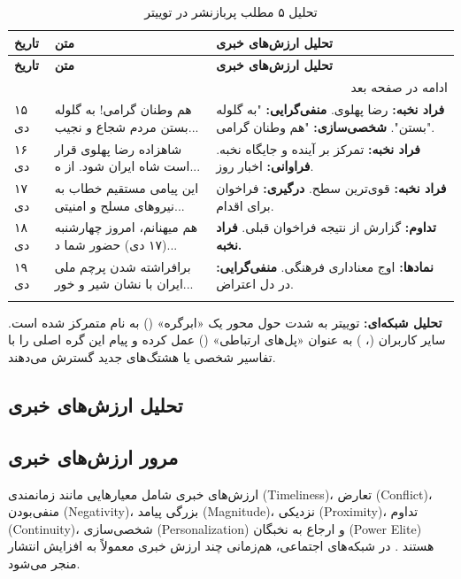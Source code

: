 \documentclass{article}
\begin{document}
	\begin{longtable}[c]{|p{1.5cm}|p{5cm}|p{7cm}|}
		\hline
		\textbf{تاریخ} & \textbf{متن} & \textbf{تحلیل ارزش‌های خبری} \\
		\hline
		\endfirsthead
		
		\hline
		\textbf{تاریخ} & \textbf{متن} & \textbf{تحلیل ارزش‌های خبری} \\
		\hline
		\endhead
		
		\hline \multicolumn{3}{r}{{ادامه در صفحه بعد}} \\
		\endfoot
		
		\hline
		\endlastfoot
		
		۱۵ دی & هم وطنان گرامی! به گلوله بستن مردم شجاع و نجیب... & \textbf{فراد نخبه:} رضا پهلوی. \textbf{منفی‌گرایی:} "به گلوله بستن". \textbf{شخصی‌سازی:} "هم وطنان گرامی". \\
		\hline
		۱۶ دی & شاهزاده رضا پهلوی قرار است شاه ایران شود. از ه... & \textbf{فراد نخبه:} تمرکز بر آینده و جایگاه نخبه. \textbf{فراوانی:} اخبار روز. \\
		\hline
		۱۷ دی & این پیامی مستقیم خطاب به نیروهای مسلح و امنیتی... & \textbf{فراد نخبه:} قوی‌ترین سطح. \textbf{درگیری:} فراخوان برای اقدام. \\
		\hline
		۱۸ دی & هم میهنانم، امروز چهارشنبه (۱۷ دی) حضور شما د... & \textbf{تداوم:} گزارش از نتیجه فراخوان قبلی. \textbf{فراد نخبه.} \\
		\hline
		۱۹ دی & برافراشته شدن پرچم ملی ایران با نشان شیر و خور... & \textbf{نمادها:} اوج معناداری فرهنگی. \textbf{منفی‌گرایی:} در دل اعتراض. \\
		\hline
		\caption{تحلیل ۵ مطلب پربازنشر در توییتر}
	\end{longtable}
	
	\textbf{تحلیل شبکه‌ای:} توییتر به شدت حول محور یک «ابرگره» () به نام  متمرکز شده است. سایر کاربران (، ) به عنوان «پل‌های ارتباطی» () عمل کرده و پیام این گره اصلی را با تفاسیر شخصی یا هشتگ‌های جدید گسترش می‌دهند.
	
	
	\subsection{تحلیل ارزش‌های خبری }
	
	\subsection{مرور ارزش‌های خبری}
	ارزش‌های خبری شامل معیارهایی مانند زمانمندی (Timeliness)، تعارض (Conflict)،
	منفی‌بودن (Negativity)، بزرگی پیامد (Magnitude)، نزدیکی (Proximity)،
	تداوم (Continuity)، شخصی‌سازی (Personalization) و ارجاع به نخبگان (Power Elite)
	هستند \cite{harcup2001,harcup2017}. 
	در شبکه‌های اجتماعی، هم‌زمانی چند ارزش خبری معمولاً به افزایش انتشار منجر می‌شود.
	
\end{document}

